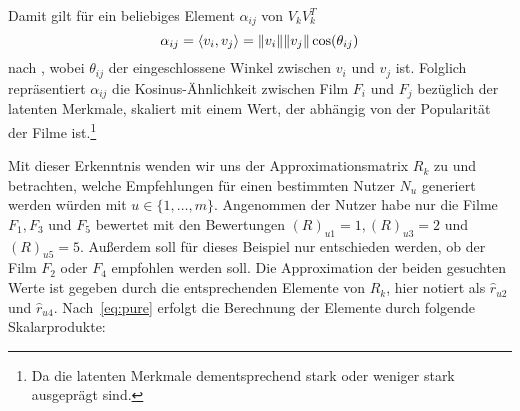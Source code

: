 Damit gilt für ein beliebiges Element \(\alpha_{ij}\) von \(V_{k}V_{k}^{T}\)
\begin{equation}\label{eq:purecos}
    \alpha_{ij} = \langle v_{i},v_{j} \rangle = \lVert v_{i}\rVert\lVert v_{j}\rVert\cos(\theta_{ij})
\end{equation}
nach , wobei \(\theta_{ij}\) der eingeschlossene Winkel zwischen \(v_{i}\) und \(v_{j}\) ist.    
Folglich repräsentiert \(\alpha_{ij}\) die Kosinus-Ähnlichkeit zwischen Film \(F_{i}\) und \(F_{j}\) bezüglich der latenten Merkmale, skaliert mit einem Wert, der abhängig von der Popularität der Filme ist.\footnote{Da die latenten Merkmale dementsprechend stark oder weniger stark ausgeprägt sind.}   

Mit dieser Erkenntnis wenden wir uns der Approximationsmatrix \(R_{k}\) zu und betrachten, welche Empfehlungen für einen bestimmten Nutzer \(N_{u}\) generiert werden würden mit \(u \in \{1,\ldots,m\}\).
Angenommen der Nutzer habe nur die Filme \(F_{1}, F_{3}\) und \(F_{5}\) bewertet mit den Bewertungen \({(R)}_{u1} = 1, {(R)}_{u3} = 2\) und \({(R)}_{u5} = 5\).
Außerdem soll für dieses Beispiel nur entschieden werden, ob der Film \(F_{2}\) oder \(F_{4}\) empfohlen werden soll.  
Die Approximation der beiden gesuchten Werte ist gegeben durch die entsprechenden Elemente von \(R_{k}\), hier notiert als \(\hat{r}_{u2}\) und \(\hat{r}_{u4}\).  
Nach~\eqref{eq:pure} erfolgt die Berechnung der Elemente durch folgende Skalarprodukte:
